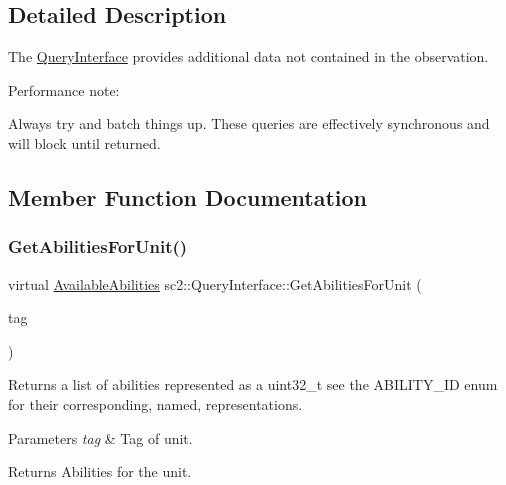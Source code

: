 \subsection{Detailed Description}
The \hyperlink{classsc2_1_1_query_interface}{Query\+Interface} provides additional data not contained in the observation.

Performance note\+:
\begin{DoxyItemize}
\item Always try and batch things up. These queries are effectively synchronous and will block until returned. 
\end{DoxyItemize}

\subsection{Member Function Documentation}
\mbox{\label{classsc2_1_1_query_interface_a5e06452df74dc9cf0c8cafe8fe42e85b}} 
\subsubsection{\texorpdfstring{Get\+Abilities\+For\+Unit()}{GetAbilitiesForUnit()}}
{\footnotesize\ttfamily virtual \hyperlink{structsc2_1_1_available_abilities}{Available\+Abilities} sc2\+::\+Query\+Interface\+::\+Get\+Abilities\+For\+Unit (\begin{DoxyParamCaption}\item[{Tag}]{tag }\end{DoxyParamCaption})\hspace{0.3cm}{\ttfamily [pure virtual]}}

Returns a list of abilities represented as a uint32\+\_\+t see the A\+B\+I\+L\+I\+T\+Y\+\_\+\+ID enum for their corresponding, named, representations. 
\begin{DoxyParams}{Parameters}
{\em tag} & Tag of unit. \\
\hline
\end{DoxyParams}
\begin{DoxyReturn}{Returns}
Abilities for the unit. 
\end{DoxyReturn}
\mbox{\label{classsc2_1_1_query_interface_acf20e12a5b9b8ffb419384df58db023f}} 
